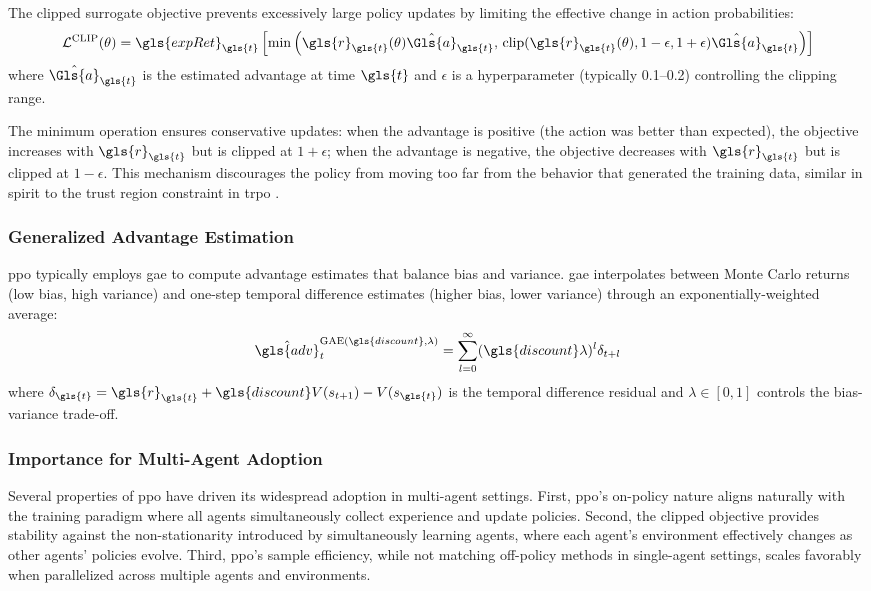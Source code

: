 The clipped surrogate objective prevents excessively large policy updates by 
limiting the effective change in action probabilities:
\begin{equation}
    \mathcal{L}^{\text{CLIP}}(\theta) = \gls{expRet}_{\gls{t}} \left[ 
        \min \left( \gls{r}_{\gls{t}}(\theta) \hat{\Gls{a}}_{\gls{t}}, 
        \, \text{clip}(\gls{r}_{\gls{t}}(\theta), 1-\epsilon, 1+\epsilon) 
        \hat{\Gls{a}}_{\gls{t}} \right) \right]
\end{equation}
where \(\hat{\Gls{a}}_{\gls{t}}\) is the estimated advantage at time \(\gls{t}\) and 
\(\epsilon\) is a hyperparameter (typically 0.1--0.2) controlling the clipping range.

The minimum operation ensures conservative updates: when the advantage is positive 
(the action was better than expected), the objective increases with \(\gls{r}_{\gls{t}}\)
but is clipped at \(1+\epsilon\); when the advantage is negative, 
the objective decreases with \(\gls{r}_{\gls{t}}\) but is clipped at \(1-\epsilon\). 
This mechanism discourages the policy from moving too far from the behavior that 
generated the training data, similar in spirit to the trust region constraint in
\gls{trpo} \cite{kakade2002}.

\subsubsection{Generalized Advantage Estimation}

\Gls{ppo} typically employs \gls{gae} to compute advantage estimates that 
balance bias and variance. \Gls{gae} interpolates between Monte Carlo returns 
(low bias, high variance) and one-step temporal difference estimates 
(higher bias, lower variance) through an exponentially-weighted average:
\begin{equation}
    \hat{\gls{adv}}_t^{\text{GAE}(\gls{discount}, \lambda)} 
    = \sum_{l=0}^{\infty} (\gls{discount} \lambda)^l \delta_{t+l}
\end{equation}
where \(\delta_{\gls{t}} = \gls{r}_{\gls{t}} + \gls{discount} V(s_{t+1}) 
- V(s_{\gls{t}})\) is the temporal difference residual and 
\(\lambda \in [0,1]\) controls the bias-variance trade-off.

\subsubsection{Importance for Multi-Agent Adoption}

Several properties of \gls{ppo} have driven its widespread adoption in multi-agent settings. 
First, \gls{ppo}'s on-policy nature aligns naturally with the training paradigm where 
all agents simultaneously collect experience and update policies. Second, 
the clipped objective provides stability against the non-stationarity 
introduced by simultaneously learning agents, where each agent's environment 
effectively changes as other agents' policies evolve. Third, \gls{ppo}'s sample efficiency, 
while not matching off-policy methods in single-agent settings, scales favorably when 
parallelized across multiple agents and environments.

